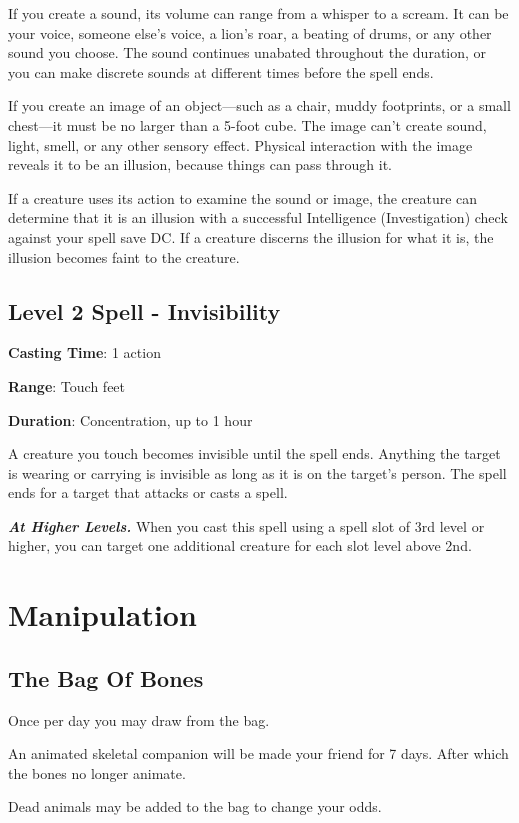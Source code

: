 \documentclass{article}
\begin{document}
If you create a sound, its volume can range from a whisper to a scream. It can be your voice, someone else’s voice, a lion’s roar, a beating of drums, or any other sound you choose. The sound continues unabated throughout the duration, or you can make discrete sounds at different times before the spell ends.

If you create an image of an object—such as a chair, muddy footprints, or a small chest—it must be no larger than a 5-foot cube. The image can’t create sound, light, smell, or any other sensory effect. Physical interaction with the image reveals it to be an illusion, because things can pass through it.

If a creature uses its action to examine the sound or image, the creature can determine that it is an illusion with a successful Intelligence (Investigation) check against your spell save DC. If a creature discerns the illusion for what it is, the illusion becomes faint to the creature.

\subsection{Level 2 Spell - Invisibility}
\noindent\textbf{Casting Time}: 1 action

\noindent\textbf{Range}: Touch feet

\noindent\textbf{Duration}: Concentration, up to 1 hour

A creature you touch becomes invisible until the spell ends. Anything the target is wearing or carrying is invisible as long as it is on the target’s person. The spell ends for a target that attacks or casts a spell.

\textbf{\textit{At Higher Levels.}} When you cast this spell using a spell slot of 3rd level or higher, you can target one additional creature for each slot level above 2nd.

\section{Manipulation}
\subsection{The Bag Of Bones}
Once per day you may draw from the bag.

An animated skeletal companion will be made your friend for 7 days. After which the bones no longer animate.

Dead animals may be added to the bag to change your odds.
\end{document}
